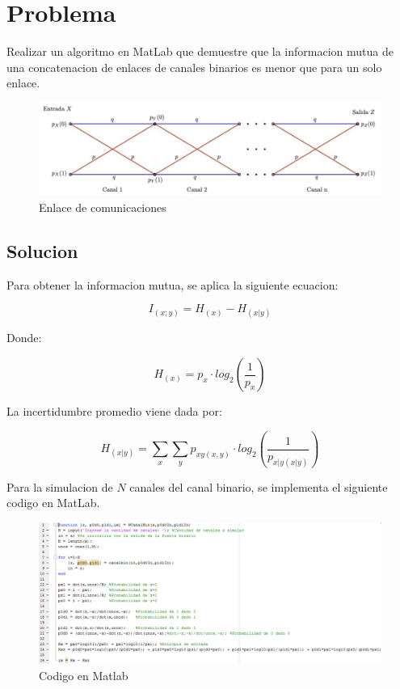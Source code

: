 \maketitle

\section{Problema}

Realizar un algoritmo en MatLab que demuestre que la informacion mutua de una concatenacion de enlaces de canales binarios es menor que para un solo enlace.

\begin{figure}[H]
    \centering
    \includegraphics[width=1\textwidth]{taller1/imagenes/canal binario.PNG}
    \caption{\label{fig1}Enlace de comunicaciones}
\end{figure}

\subsection{Solucion}

Para obtener la informacion mutua, se aplica la siguiente ecuacion:

\begin{equation}
    I_{(x;y)}=H_{(x)}-H_{(x|y)}
\end{equation}

Donde:

\begin{equation}
    H_{(x)}=p_{x}\cdot log_{2}(\frac{1}{p_x})
\end{equation}

La incertidumbre promedio viene dada por:

\begin{equation}
    H_{(x|y)}=\sum_{x}\sum_{y}p_{xy(x,y)}\cdot log_{2}(\frac{1}{p_{x|y(x|y)}})
\end{equation}

Para la simulacion de $N$ canales del canal binario, se implementa el siguiente codigo en MatLab.

\begin{figure}[H]
    \centering
    \includegraphics[width=1\textwidth]{taller1/imagenes/codigo canal binario.PNG}
    \caption{\label{fig1}Codigo en Matlab}
\end{figure}

